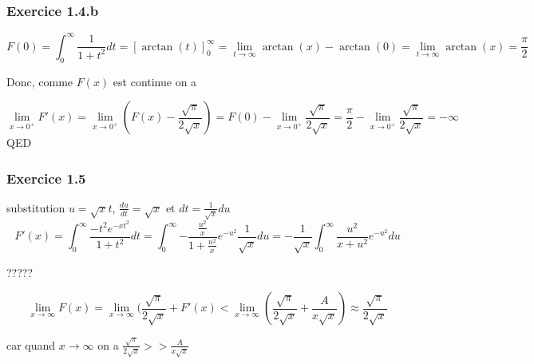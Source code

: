 \documentclass[]{book}
\theoremstyle{definition}
\begin{document}
\subsubsection*{Exercice 1.4.b}

$$
F(0) = \int_{0}^{\infty}{\frac{1}{1+t^2}dt} = [ \arctan(t) ]_{0}^{\infty} = \lim_{t \to \infty} \arctan(x) - \arctan(0) = \lim_{t \to \infty} \arctan(x) = \frac{\pi}{2}
$$

Donc, comme $F(x)$ est continue on a 

$$
\lim_{x \to 0^{+}} F'(x) = \lim_{x \to 0^{+}} (F(x) - \frac{\sqrt{\pi}}{2\sqrt{x}}) = F(0) - \lim_{x \to 0^{+}} \frac{\sqrt{\pi}}{2\sqrt{x}} = \frac{\pi}{2} - \lim_{x \to 0^{+}}\frac{\sqrt{\pi}}{2\sqrt{x}} = -\infty 
$$
QED


\subsubsection*{Exercice 1.5}

substitution $u=\sqrt{x}t$,  $\frac{du}{dt}=\sqrt{x}$ et $dt = \frac{1}{\sqrt{x}}du$
$$
F'(x) = \int_{0}^{\infty}{\frac{-t^2e^{-xt^2}}{1+t^2}dt} = \int_{0}^{\infty}{-\frac{\frac{u^2}{x}}{1+\frac{u^2}{x}}e^{-u^2}\frac{1}{\sqrt{x}}du} = -\frac{1}{\sqrt{x}}\int_{0}^{\infty}{\frac{u^2}{x+{u^2}}e^{-u^2}du}
$$

?????


$$
\lim_{x \to \infty} F(x) = \lim_{x \to \infty} (\frac{\sqrt{\pi}}{2\sqrt{x}} + F'(x) < \lim_{x \to \infty} (\frac{\sqrt{\pi}}{2\sqrt{x}} + \frac{A}{x\sqrt{x}})  \approx \frac{\sqrt{\pi}}{2\sqrt{x}} 
$$

car quand $x \to \infty$ on a $\frac{\sqrt{\pi}}{2\sqrt{x}} >> \frac{A}{x\sqrt{x}}$
\end{document}
